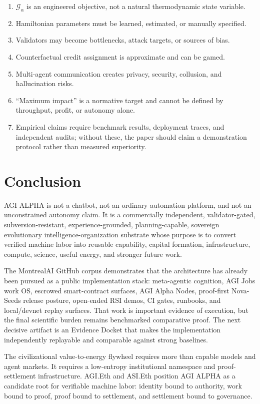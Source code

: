 \begin{enumerate}
\def\labelenumi{\arabic{enumi}.}
\tightlist
\item
  \(\mathcal{G}_{\alpha}\) is an engineered objective, not a natural
  thermodynamic state variable.
\item
  Hamiltonian parameters must be learned, estimated, or manually
  specified.
\item
  Validators may become bottlenecks, attack targets, or sources of bias.
\item
  Counterfactual credit assignment is approximate and can be gamed.
\item
  Multi-agent communication creates privacy, security, collusion, and
  hallucination risks.
\item
  ``Maximum impact'' is a normative target and cannot be defined by
  throughput, profit, or autonomy alone.
\item
  Empirical claims require benchmark results, deployment traces, and
  independent audits; without these, the paper should claim a
  demonstration protocol rather than measured superiority.
\end{enumerate}

\section{Conclusion}\label{conclusion}

AGI ALPHA is not a chatbot, not an ordinary automation platform, and not
an unconstrained autonomy claim. It is a commercially independent,
validator-gated, subversion-resistant, experience-grounded,
planning-capable, sovereign evolutionary intelligence-organization
substrate whose purpose is to convert verified machine labor into
reusable capability, capital formation, infrastructure, compute,
science, useful energy, and stronger future work.

The MontrealAI GitHub corpus demonstrates that the architecture has
already been pursued as a public implementation stack: meta-agentic
cognition, AGI Jobs work OS, escrowed smart-contract surfaces, AGI Alpha
Nodes, proof-first Nova-Seeds release posture, open-ended RSI demos, CI
gates, runbooks, and local/devnet replay surfaces. That work is
important evidence of execution, but the final scientific burden remains
benchmarked comparative proof. The next decisive artifact is an Evidence
Docket that makes the implementation independently replayable and
comparable against strong baselines.

The civilizational value-to-energy flywheel requires more than capable
models and agent markets. It requires a low-entropy institutional
namespace and proof-settlement infrastructure. AGI.Eth and ASI.Eth
position AGI ALPHA as a candidate root for verifiable machine labor:
identity bound to authority, work bound to proof, proof bound to
settlement, and settlement bound to governance.

